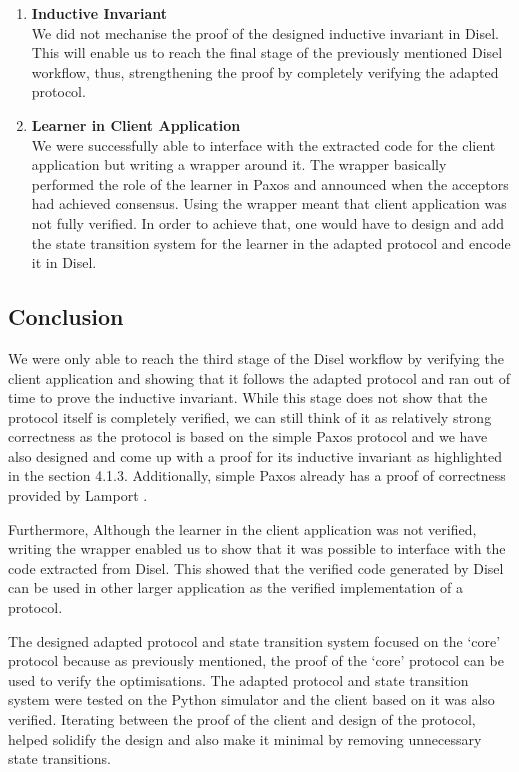 \begin{enumerate}
  \item \textbf{Inductive Invariant} \\
    We did not mechanise the proof of the designed inductive invariant in Disel.
    This will enable us to reach the final stage of the previously mentioned Disel workflow,
    thus, strengthening the proof by completely verifying the adapted protocol.
  \item \textbf{Learner in Client Application} \\
    We were successfully able to interface with the extracted code for the client
    application but writing a wrapper around it. The wrapper basically performed
    the role of the learner in Paxos and announced when the acceptors had
    achieved consensus. Using the wrapper meant that client application was not
    fully verified. In order to achieve that, one would have to design and add the
    state transition system for the learner in the adapted protocol and encode it
    in Disel.
\end{enumerate}

\vspace{-5mm}
\subsection{Conclusion}
We were only able to reach the third stage of the Disel workflow by
verifying the client application and showing that it follows the
adapted protocol and ran out of time to prove the inductive invariant.
While this stage does not show that the protocol itself
is completely verified, we can still think of it as relatively strong
correctness as the protocol is based on the simple Paxos protocol and
we have also designed and come up with a proof for its inductive invariant
as highlighted in the section 4.1.3. Additionally, simple Paxos already has
a proof of correctness provided by Lamport \cite{4}.

Furthermore, Although the learner in the client application was not verified,
writing the wrapper enabled us to show that it was possible to interface with
the code extracted from Disel. This showed that the verified code generated by
Disel can be used in other larger application as the verified implementation of
a protocol.

The designed adapted protocol and state transition system focused on
the `core' protocol because as previously mentioned, the proof of the `core'
protocol can be used to verify the optimisations. The adapted protocol and
state transition system were tested on the Python simulator and the client
based on it was also verified. Iterating between the proof of the client
and design of the protocol, helped solidify the design and also make it
minimal by removing unnecessary state transitions.

